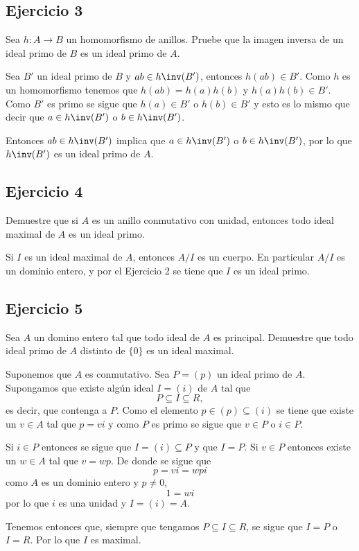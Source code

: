 \subsection*{Ejercicio 3}
	Sea $h\colon A \to B$ un homomorfismo de anillos. Pruebe que la imagen
inversa de un ideal primo de $B$ es un ideal primo de $A$. 
\begin{sol}
	Sea $B'$ un ideal primo de $B$ y $ab\in h\inv(B')$, entonces $h(ab)\in B'$. Como $h$ es un homomorfismo tenemos que $h(ab)=h(a)h(b)$ y $h(a)h(b)\in B'$. Como $B'$ es primo se sigue que $h(a)\in B'$ o $h(b)\in B'$ y esto es lo mismo que decir que $a\in h\inv(B')$ o $b\in h\inv(B')$. 
	
	Entonces $ab\in h\inv(B')$ implica que $a\in h\inv(B')$ o $b\in h\inv(B')$, por lo que $h\inv(B')$ es un ideal primo de $A$.
\end{sol}
\subsection*{Ejercicio 4}
	Demuestre que si $A$ es un anillo conmutativo con unidad, entonces todo
ideal maximal de $A$ es un ideal primo.
\begin{sol}
	Si $I$ es un ideal maximal de $A$, entonces $A/I$ es un cuerpo. En particular $A/I$ es un dominio entero, y por el Ejercicio 2 se tiene que $I$ es un ideal primo. 
\end{sol}
\subsection*{Ejercicio 5}
	Sea $A$ un domino entero tal que todo ideal de $A$ es principal. Demuestre
que todo ideal primo de $A$ distinto de $\{0\}$ es un ideal maximal.
\begin{sol}
	Suponemos que $A$ es conmutativo. Sea $P=(p)$ un ideal primo de $A$. Supongamos que existe algún ideal $I = (i)$ de $A$ tal que
	\[ P \subseteq I \subseteq R, \]
	es decir, que contenga a $P$. Como el elemento $p \in (p)\subseteq (i)$ se tiene que existe un $v\in A$ tal que $p=vi$ y como $P$ es primo se sigue que $v\in P$ o $i\in P$.
	
	Si $i\in P$ entonces se sigue que $I = (i) \subseteq P$ y que $I = P$. Si $v\in P$ entonces existe un $w\in A$ tal que $v=wp$. De donde se sigue que
	\[ p = vi = wpi \]
	como $A$ es un dominio entero y $p\neq 0$,
	\[ 1=wi \]
	por lo que $i$ es una unidad y $I=(i)=A$.
	
	Tenemos entonces que, siempre que tengamos $P \subseteq I \subseteq R$, se sigue que $I=P$ o $I=R$. Por lo que $I$ es maximal.
\end{sol}
